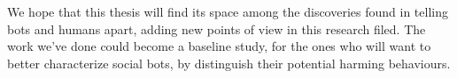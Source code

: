 We hope that this thesis will find its space among the discoveries found in telling bots and humans apart, adding new points of view in this research filed. The work we've done could become a baseline study, for the ones who will want to better characterize social bots, by distinguish their potential harming behaviours.
